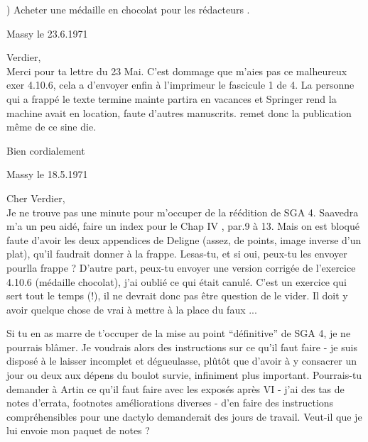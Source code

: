 ) Acheter une médaille en chocolat pour les rédacteurs .

\begin{flushright}
Massy le 23.6.1971\\
\end{flushright}
 Verdier,\\

Merci pour ta lettre du 23 Mai. C'est dommage que   m'aies pas  ce malheureux exer 4.10.6, cela a  d'envoyer enfin à l'imprimeur le fascicule 1 de  4. La personne qui a frappé le texte termine mainte  partira en vacances et Springer rend la machine  avait en location, faute d'autres manuscrits.  remet donc la publication même de ce  sine die.

Bien cordialement\\

\begin{flushright}
Massy le 18.5.1971\\
\end{flushright}
Cher Verdier,\\

Je ne trouve pas une minute pour m'occuper de la réédition de SGA 4. Saavedra m'a un peu aidé,  faire un index pour le Chap IV , par.9 à 13. Mais on est bloqué faute d'avoir les deux appendices de Deligne (assez, de points, image inverse d'un plat), qu'il faudrait donner à la frappe. Lesas-tu, et si oui, peux-tu les envoyer pourlla frappe ? D'autre part, peux-tu envoyer une version corrigée de l'exercice 4.10.6 (médaille chocolat), j'ai  oublié ce qui était canulé. C'est un exercice qui sert tout le temps (!), il ne devrait donc pas être question de le vider. Il doit y avoir quelque chose de vrai à mettre à la place du faux ...

Si tu en as marre de t'occuper de la mise au point ``définitive'' de SGA 4, je ne pourrais  blâmer. Je voudrais alors des instructions sur ce qu'il faut faire - je suis disposé à le laisser incomplet et dégueulasse, plûtôt que d'avoir à  y consacrer un jour ou deux aux dépens du boulot survie, infiniment plus important. Pourrais-tu demander à Artin ce qu'il faut faire avec les exposés après VI - j'ai des tas de notes d'errata, footnotes améliorations diverses - d'en faire des instructions compréhensibles pour une dactylo demanderait des jours de travail. Veut-il que je lui envoie mon paquet de notes ?

